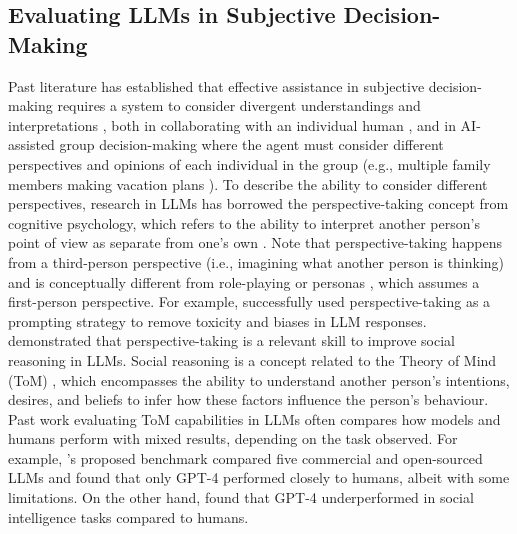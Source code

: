 \subsection{Evaluating LLMs in Subjective Decision-Making}

Past literature has established that effective assistance in subjective decision-making requires a system to consider divergent understandings and interpretations \cite{frenda2024perspectivist, sorensen2024roadmap}, both in collaborating with an individual human \cite{ferguson2023something}, and in AI-assisted group decision-making where the agent must consider different perspectives and opinions of each individual in the group (e.g., multiple family members making vacation plans \cite{delic2024supporting}). To describe the ability to consider different perspectives, research in LLMs has borrowed \cite{xu2024walking,wilf2023think} the perspective-taking concept \cite{batson1997perspective} from cognitive psychology, which refers to the ability to interpret another person's point of view as separate from one's own \cite{healey2018cognitive, batson1997perspective}. Note that perspective-taking happens from a third-person perspective (i.e., imagining what another person is thinking) and is conceptually different from role-playing \cite{lu2024role-play} or personas \cite{ha2024clochat}, which assumes a first-person perspective. 
For example, \citet{xu2024walking} successfully used perspective-taking as a prompting strategy to remove toxicity and biases in LLM responses. \citet{wilf2023think} demonstrated that perspective-taking is a relevant skill to improve social reasoning in LLMs. Social reasoning is a concept related to the Theory of Mind (ToM) \cite{ullman2023largetom, y2022largetom}, which encompasses the ability to understand another person's intentions, desires, and beliefs to infer how these factors influence the person's behaviour. Past work evaluating ToM capabilities in LLMs often compares how models and humans perform with mixed results, depending on the task observed. For example, \citet{gandhi2024understanding}'s proposed benchmark compared five commercial and open-sourced LLMs and found that only GPT-4 performed closely to humans, albeit with some limitations. On the other hand, \citet{wang2024evaluating} found that GPT-4 underperformed in social intelligence tasks compared to humans.

